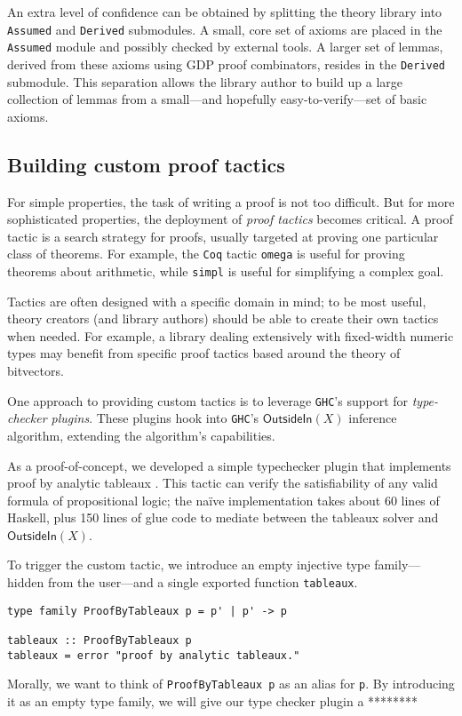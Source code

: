 \documentclass[format=sigplan, review=false, screen=true]{acmart}
\begin{document}
An extra level of confidence can be obtained by splitting the theory library
into \texttt{Assumed} and \texttt{Derived} submodules. A small, core set of
axioms are placed in the \texttt{Assumed} module and possibly checked by
external tools. A larger set of lemmas, derived from these axioms using GDP
proof combinators, resides in the \texttt{Derived} submodule. This separation
allows the library author to build up a large collection of lemmas from a
small---and hopefully easy-to-verify---set of basic axioms.

\subsection{Building custom proof tactics}

For simple properties, the task of writing a proof is not too difficult. But for
more sophisticated properties, the deployment of \emph{proof tactics} becomes
critical. A proof tactic is a search strategy for proofs, usually targeted at
proving one particular class of theorems. For example, the \texttt{Coq} tactic
\texttt{omega} is useful for proving theorems about arithmetic, while
\texttt{simpl} is useful for simplifying a complex goal.

Tactics are often designed with a specific domain in mind; to be most useful,
theory creators (and library authors) should be able to create their own tactics
when needed. For example, a library dealing extensively with fixed-width numeric types
may benefit from specific proof tactics based around the theory of bitvectors.

One approach to providing custom tactics is to leverage \texttt{GHC}'s support for
\emph{type-checker plugins}. These plugins hook into \texttt{GHC}'s $\textsf{OutsideIn}(X)$
inference algorithm, extending the algorithm's capabilities.

As a proof-of-concept, we developed a simple typechecker plugin that implements
proof by analytic tableaux \cite{smullyan1995first}. This tactic can verify the satisfiability of any
valid formula of propositional logic; the na\"ive implementation takes about
60 lines of Haskell, plus 150 lines of glue code to mediate between
the tableaux solver and $\textsf{OutsideIn}(X)$.

To trigger the custom tactic, we introduce an empty injective type family---hidden
from the user---and a single exported function \texttt{tableaux}.
\begin{verbatim}
type family ProofByTableaux p = p' | p' -> p

tableaux :: ProofByTableaux p
tableaux = error "proof by analytic tableaux."
\end{verbatim}
Morally, we want to think of \texttt{ProofByTableaux p} as an alias for \texttt{p}.
By introducing it as an empty type family, we will give our type checker plugin a
********
\end{document}
